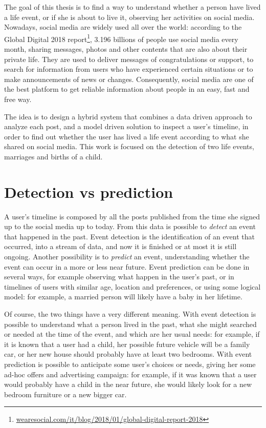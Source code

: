 The goal of this thesis is to find a way to understand whether a person have lived a life event, or if she is about to live it, observing her activities on social media. Nowadays, social media are widely used all over the world: according to the Global Digital 2018 report\footnote{\url{wearesocial.com/it/blog/2018/01/global-digital-report-2018}}, 3.196 billions of people use social media every month, sharing messages, photos and other contents that are also about their private life. They are used to deliver messages of congratulations or support, to search for information from users who have experienced certain situations or to make announcements of news or changes. Consequently, social media are one of the best platform to get reliable information about people in an easy, fast and free way.

The idea is to design a hybrid system that combines a data driven approach to analyze each post, and a model driven solution to inspect a user's timeline, in order to find out whether the user has lived a life event according to what she shared on social media. This work is focused on the detection of two life events, marriages and births of a child.

\section{Detection vs prediction}

A user's timeline is composed by all the posts published from the time she signed up to the social media up to today. From this data is possible to \emph{detect} an event that happened in the past. Event detection is the identification of an event that occurred, into a stream of data, and now it is finished or at most it is still ongoing. Another possibility is to \emph{predict} an event, understanding whether the event can occur in a more or less near future. Event prediction can be done in several ways, for example observing what happen in the user's past, or in timelines of users with similar age, location and preferences, or using some logical model: for example, a married person will likely have a baby in her lifetime.

Of course, the two things have a very different meaning. With event detection is possible to understand what a person lived in the past, what she might searched or needed at the time of the event, and which are her usual needs: for example, if it is known that a user had a child, her possible future vehicle will be a family car, or her new house should probably have at least two bedrooms. With event prediction is possible to anticipate some user's choices or needs, giving her some ad-hoc offers and advertising campaign: for example, if it was known that a user would probably have a child in the near future, she would likely look for a new bedroom furniture or a new bigger car.

